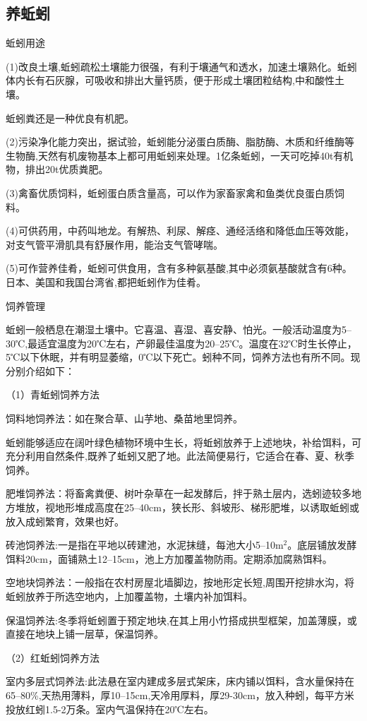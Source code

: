 \documentclass{ctexbook}
\begin{document}
\subsection{养蚯蚓}
蚯蚓用途

(1)改良土壤,蚯蚓疏松土壤能力很强，有利于壤通气和透水，加速土壤熟化。蚯蚓体内长有石灰腺，可吸收和排出大量钙质，便于形成土壤团粒结构,中和酸性土壤。

蚯蚓粪还是一种优良有机肥。

(2)污染净化能力突出，据试验，蚯蚓能分泌蛋白质酶、脂肪酶、木质和纤维酶等生物酶,天然有机废物基本上都可用蚯蚓来处理。1亿条蚯蚓，一天可吃掉40t有机物，排出20t优质粪肥。

(3)禽畜优质饲料，蚯蚓蛋白质含量高，可以作为家畜家禽和鱼类优良蛋白质饲料。

(4)可供药用，中药叫地龙。有解热、利尿、解痉、通经活络和降低血压等效能，对支气管平滑肌具有舒展作用，能治支气管哮喘。

(5)可作营养佳肴，蚯蚓可供食用，含有多种氨基酸,其中必须氨基酸就含有6种。日本、美国和我国台湾省,都把蚯蚓作为佳肴。

饲养管理

蚯蚓一般栖息在潮湿土壤中。它喜温、喜湿、喜安静、怕光。一般活动温度为5--30℃,最适宜温度为20℃左右，产卵最佳温度为20--25℃。温度在32℃时生长停止，5℃以下休眠，并有明显萎缩，0℃以下死亡。蚓种不同，饲养方法也有所不同。现分别介绍如下：

（1）青蚯蚓饲养方法

饲料地饲养法：如在聚合草、山芋地、桑苗地里饲养。

蚯蚓能够适应在阔叶绿色植物环境中生长，将蚯蚓放养于上述地块，补给饵料，可充分利用自然条件,既养了蚯蚓又肥了地。此法简便易行，它适合在春、夏、秋季饲养。

肥堆饲养法：将畜禽粪便、树叶杂草在一起发酵后，拌于熟土层内，选蚓迹较多地方堆放，视地形堆成高度在25--40cm，狭长形、斜坡形、梯形肥堆，以诱取蚯蚓或放入成蚓繁育，效果也好。

砖池饲养法:一是指在平地以砖建池，水泥抹缝，每池大小5--10m$^2$。底层铺放发酵饵料20cm，面铺熟土12--15cm，池上方加覆盖物防雨。定期添加腐熟饵料。

空地块饲养法：一般指在农村房屋北墙脚边，按地形定长短,周围开挖排水沟，将蚯蚓放养于所选空地内，上加覆盖物，土壤内补加饵料。

保温饲养法:冬季将蚯蚓置于预定地块,在其上用小竹搭成拱型框架，加盖薄膜，或直接在地块上铺一层草，保温饲养。

（2）红蚯蚓饲养方法

室内多层式饲养法:此法悬在室内建成多层式架床，床内铺以饵料，含水量保持在65--80\%,天热用薄料，厚10--15cm,天冷用厚料，厚29-30cm，放入种蚓，每平方米投放红蚓1.5-2万条。室内气温保持在20℃左右。
\end{document}
